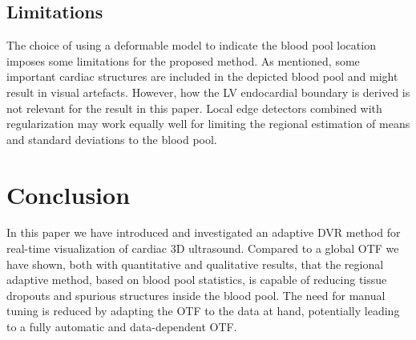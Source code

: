 \subsection{Limitations}
The choice of using a deformable model to indicate the blood pool location imposes some limitations for the proposed method. As mentioned, some important cardiac structures are included in the depicted blood pool and might result in visual artefacts. However, how the LV endocardial boundary is derived is not relevant for the result in this paper. Local edge detectors combined with regularization may work equally well for limiting the regional estimation of means and standard deviations to the blood pool.



\section{Conclusion}
In this paper we have introduced and investigated an adaptive DVR method for real-time visualization of cardiac 3D ultrasound. Compared to a global OTF we have shown, both with quantitative and qualitative results, that the regional adaptive method, based on blood pool statistics, is capable of reducing tissue dropouts and spurious structures inside the blood pool. The need for manual tuning is reduced by adapting the OTF to the data at hand, potentially leading to a fully automatic and data-dependent OTF.
